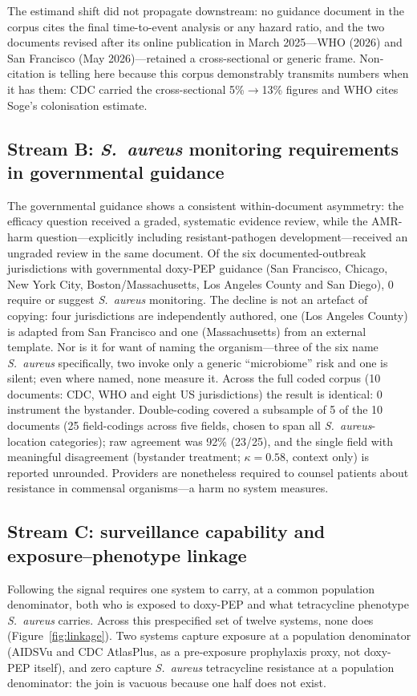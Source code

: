 \documentclass[12pt,a4paper]{article}
\newcommand{\sa}{\emph{S.~aureus}}
\begin{document}
The estimand shift did not propagate downstream: no guidance document in the
corpus cites the final time-to-event analysis or any hazard ratio, and the two
documents revised after its online publication in March 2025---WHO (2026) and San
Francisco (May 2026)---retained a cross-sectional or generic frame. Non-citation
is telling here because this corpus demonstrably transmits numbers when it has
them: CDC carried the cross-sectional 5\%$\rightarrow$13\% figures and WHO cites
Soge's colonisation estimate.\cite{soge2025}

\subsection*{Stream B: \sa{} monitoring requirements in governmental guidance}
The governmental guidance shows a consistent within-document asymmetry: the
efficacy question received a graded, systematic evidence review, while the
AMR-harm question---explicitly including resistant-pathogen development---received
an ungraded review in the same document. Of the six documented-outbreak
jurisdictions with governmental doxy-PEP guidance (San Francisco, Chicago, New
York City, Boston/Massachusetts, Los Angeles County and San Diego), 0 require or
suggest \sa{} monitoring. The decline is not an artefact of copying: four
jurisdictions are independently authored, one (Los Angeles County) is adapted
from San Francisco and one (Massachusetts) from an external template. Nor is it
for want of naming the organism---three of the six name \sa{} specifically, two
invoke only a generic ``microbiome'' risk and one is silent; even where named,
none measure it. Across the full coded corpus (10 documents: CDC, WHO and eight
US jurisdictions) the result is identical: 0 instrument the bystander.
Double-coding covered a subsample of 5 of the 10 documents (25 field-codings
across five fields, chosen to span all \sa{}-location categories); raw agreement
was 92\% (23/25), and the single field with meaningful disagreement (bystander
treatment; $\kappa=0.58$, context only) is reported unrounded. Providers are nonetheless required to counsel patients about
resistance in commensal organisms---a harm no system measures.

\subsection*{Stream C: surveillance capability and exposure--phenotype linkage}
Following the signal requires one system to carry, at a common population
denominator, both who is exposed to doxy-PEP and what tetracycline phenotype \sa{}
carries. Across this prespecified set of twelve systems, none does
(Figure~\ref{fig:linkage}). Two systems capture exposure at a population
denominator (AIDSVu and CDC AtlasPlus, as a pre-exposure prophylaxis proxy, not
doxy-PEP itself),\cite{aidsvu} and zero capture \sa{} tetracycline resistance at a
population denominator: the join is vacuous because one half does not exist.
\end{document}
